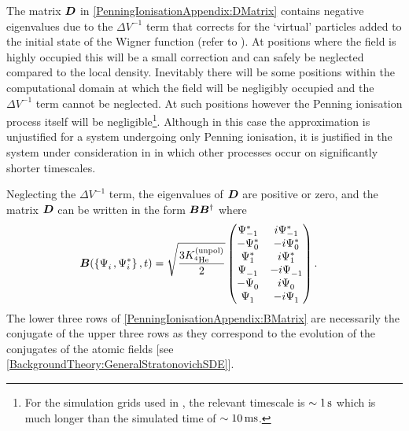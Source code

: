 The matrix $\bm{D}$ in \eqref{PenningIonisationAppendix:DMatrix} contains negative eigenvalues due to the $\Delta V^{-1}$ term that corrects for the `virtual' particles added to the initial state of the Wigner function (refer to ). At positions where the field is highly occupied this will be a small correction and can safely be neglected compared to the local density. Inevitably there will be some positions within the computational domain at which the field will be negligibly occupied and the $\Delta V^{-1}$ term cannot be neglected. At such positions however the Penning ionisation process itself will be negligible\footnote{For the simulation grids used in , the relevant timescale is $\sim \unit[1]{s}$ which is much longer than the simulated time of $\sim \unit[10]{ms}$.}. Although in this case the approximation is unjustified for a system undergoing only Penning ionisation, it is justified in the system under consideration in  in which other processes occur on significantly shorter timescales.

Neglecting the $\Delta V^{-1}$ term, the eigenvalues of $\bm{D}$ are positive or zero, and the matrix $\bm{D}$ can be written in the form $\bm{B}\bm{B}^\dagger$ where
\begin{align}
    \vect{B}(\left\{\Psi_i^{\phantom{*}}, \Psi_i^*\right\}, t) &= \sqrt{\frac{3 \Kunpol}{2}}
    \begin{pmatrix}
        \Psi_{-1}^* & i \Psi_{-1}^* \\
        -\Psi_0^* & -i \Psi_0^* \\
        \Psi_1^* & i \Psi_1^* \\
        \Psi_{-1}^{\phantom{*}} & -i \Psi_{-1}^{\phantom{*}} \\
        -\Psi_0^{\phantom{*}} & i \Psi_0^{\phantom{*}} \\
        \Psi_{1}^{\phantom{*}} & -i \Psi_{1}^{\phantom{*}}
    \end{pmatrix}.
    \label{PenningIonisationAppendix:BMatrix}
\end{align}
The lower three rows of \eqref{PenningIonisationAppendix:BMatrix} are necessarily the conjugate of the upper three rows as they correspond to the evolution of the conjugates of the atomic fields [see \eqref{BackgroundTheory:GeneralStratonovichSDE}].

